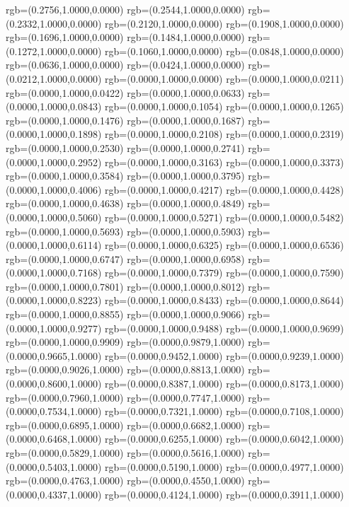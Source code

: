 {{		rgb=(0.2756,1.0000,0.0000)
		rgb=(0.2544,1.0000,0.0000)
		rgb=(0.2332,1.0000,0.0000)
		rgb=(0.2120,1.0000,0.0000)
		rgb=(0.1908,1.0000,0.0000)
		rgb=(0.1696,1.0000,0.0000)
		rgb=(0.1484,1.0000,0.0000)
		rgb=(0.1272,1.0000,0.0000)
		rgb=(0.1060,1.0000,0.0000)
		rgb=(0.0848,1.0000,0.0000)
		rgb=(0.0636,1.0000,0.0000)
		rgb=(0.0424,1.0000,0.0000)
		rgb=(0.0212,1.0000,0.0000)
		rgb=(0.0000,1.0000,0.0000)
		rgb=(0.0000,1.0000,0.0211)
		rgb=(0.0000,1.0000,0.0422)
		rgb=(0.0000,1.0000,0.0633)
		rgb=(0.0000,1.0000,0.0843)
		rgb=(0.0000,1.0000,0.1054)
		rgb=(0.0000,1.0000,0.1265)
		rgb=(0.0000,1.0000,0.1476)
		rgb=(0.0000,1.0000,0.1687)
		rgb=(0.0000,1.0000,0.1898)
		rgb=(0.0000,1.0000,0.2108)
		rgb=(0.0000,1.0000,0.2319)
		rgb=(0.0000,1.0000,0.2530)
		rgb=(0.0000,1.0000,0.2741)
		rgb=(0.0000,1.0000,0.2952)
		rgb=(0.0000,1.0000,0.3163)
		rgb=(0.0000,1.0000,0.3373)
		rgb=(0.0000,1.0000,0.3584)
		rgb=(0.0000,1.0000,0.3795)
		rgb=(0.0000,1.0000,0.4006)
		rgb=(0.0000,1.0000,0.4217)
		rgb=(0.0000,1.0000,0.4428)
		rgb=(0.0000,1.0000,0.4638)
		rgb=(0.0000,1.0000,0.4849)
		rgb=(0.0000,1.0000,0.5060)
		rgb=(0.0000,1.0000,0.5271)
		rgb=(0.0000,1.0000,0.5482)
		rgb=(0.0000,1.0000,0.5693)
		rgb=(0.0000,1.0000,0.5903)
		rgb=(0.0000,1.0000,0.6114)
		rgb=(0.0000,1.0000,0.6325)
		rgb=(0.0000,1.0000,0.6536)
		rgb=(0.0000,1.0000,0.6747)
		rgb=(0.0000,1.0000,0.6958)
		rgb=(0.0000,1.0000,0.7168)
		rgb=(0.0000,1.0000,0.7379)
		rgb=(0.0000,1.0000,0.7590)
		rgb=(0.0000,1.0000,0.7801)
		rgb=(0.0000,1.0000,0.8012)
		rgb=(0.0000,1.0000,0.8223)
		rgb=(0.0000,1.0000,0.8433)
		rgb=(0.0000,1.0000,0.8644)
		rgb=(0.0000,1.0000,0.8855)
		rgb=(0.0000,1.0000,0.9066)
		rgb=(0.0000,1.0000,0.9277)
		rgb=(0.0000,1.0000,0.9488)
		rgb=(0.0000,1.0000,0.9699)
		rgb=(0.0000,1.0000,0.9909)
		rgb=(0.0000,0.9879,1.0000)
		rgb=(0.0000,0.9665,1.0000)
		rgb=(0.0000,0.9452,1.0000)
		rgb=(0.0000,0.9239,1.0000)
		rgb=(0.0000,0.9026,1.0000)
		rgb=(0.0000,0.8813,1.0000)
		rgb=(0.0000,0.8600,1.0000)
		rgb=(0.0000,0.8387,1.0000)
		rgb=(0.0000,0.8173,1.0000)
		rgb=(0.0000,0.7960,1.0000)
		rgb=(0.0000,0.7747,1.0000)
		rgb=(0.0000,0.7534,1.0000)
		rgb=(0.0000,0.7321,1.0000)
		rgb=(0.0000,0.7108,1.0000)
		rgb=(0.0000,0.6895,1.0000)
		rgb=(0.0000,0.6682,1.0000)
		rgb=(0.0000,0.6468,1.0000)
		rgb=(0.0000,0.6255,1.0000)
		rgb=(0.0000,0.6042,1.0000)
		rgb=(0.0000,0.5829,1.0000)
		rgb=(0.0000,0.5616,1.0000)
		rgb=(0.0000,0.5403,1.0000)
		rgb=(0.0000,0.5190,1.0000)
		rgb=(0.0000,0.4977,1.0000)
		rgb=(0.0000,0.4763,1.0000)
		rgb=(0.0000,0.4550,1.0000)
		rgb=(0.0000,0.4337,1.0000)
		rgb=(0.0000,0.4124,1.0000)
		rgb=(0.0000,0.3911,1.0000)
}}
